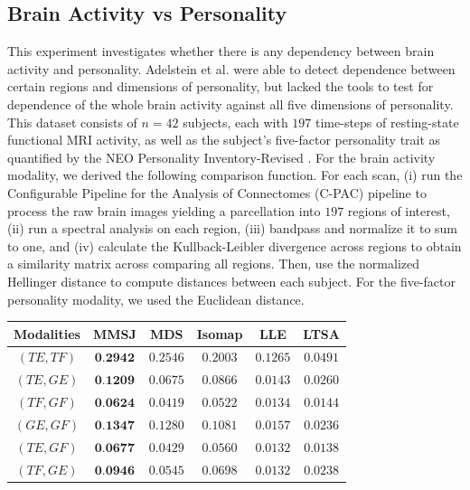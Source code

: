 \documentclass[times,twocolumn,final]{elsarticle}
\newenvironment{Table}
  {\par\bigskip\noindent\minipage{\columnwidth}\centering}
  {\endminipage\par\bigskip}
\begin{document}
\subsection{Brain Activity vs Personality}
\label{wikiReal}
This experiment investigates whether there is any dependency between brain activity and personality.
Adelstein et al. \cite{AdelsteinEtAl2011} were able to detect dependence between certain regions and dimensions of personality, but lacked the tools to test for dependence of the whole brain activity against all five dimensions of personality. 
This dataset consists of $n=42$ subjects, each with  $197$ time-steps of resting-state functional MRI activity, as well as the subject's five-factor personality trait as quantified by  the NEO Personality Inventory-Revised  \cite{Costa1992}. 
For the brain activity modality, we derived the following comparison function. For each scan, (i) 
run the Configurable Pipeline for the Analysis of Connectomes (C-PAC) pipeline \cite{CPAC2015} to process the raw brain images yielding a parcellation into $197$ regions of interest, 
(ii) run a spectral analysis on each region, (iii) bandpass and normalize it to sum to one, and (iv) calculate the Kullback-Leibler divergence across regions to obtain a similarity matrix across comparing all regions.  Then, use the normalized Hellinger distance to compute distances between each subject. 
For the five-factor personality modality, we  used the Euclidean distance.
% 


\begin{Table}
\centering
{}
\label{table:wikiAcc}%
\begin{tabular}{|c||c|c|c|c|c|}
\hline
Modalities & MMSJ & MDS & Isomap & LLE & LTSA \\
\hline
$(TE, TF)$ & $\textbf{0.2942}$  & $0.2546$ & $0.2003$ & $0.1265$ & $0.0491$\\
\hline
$(TE, GE)$ & $\textbf{0.1209}$  & $0.0675$ & $0.0866$ & $0.0143$ & $0.0260$\\
\hline
$(TF, GF)$ & $\textbf{0.0624}$  & $0.0419$ & $0.0522$ & $0.0134$ & $0.0144$\\
\hline
$(GE, GF)$ & $\textbf{0.1347}$  & $0.1280$ & $0.1081$ & $0.0157$ & $0.0236$\\
\hline
$(TE, GF)$ & $\textbf{0.0677}$  & $0.0429$ & $0.0560$ & $0.0132$ & $0.0138$\\
\hline
$(TF, GE)$ & $\textbf{0.0946}$  & $0.0545$ & $0.0698$ & $0.0132$ & $0.0238$\\
\hline
\end{tabular}
\end{Table}
\end{document}

